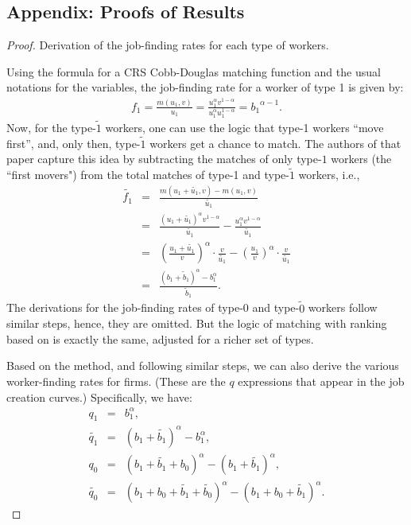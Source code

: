 \documentclass[12pt]{article} %
\theoremstyle{definition}
\begin{document}
\begin{appendix}

\renewcommand{\theequation}{A.\arabic{equation}}

\setcounter{equation}{0}

\section{Appendix: Proofs of Results}\label{section appendix proofs}
\begin{proof}{Derivation of the job-finding rates for each type of workers.}

\noindent Using the formula for a CRS Cobb-Douglas matching function and the usual notations for the variables, the job-finding rate for a worker of type 1 is given by: 
\begin{eqnarray*}
     f_1 = \frac{m(u_1,v)}{u_1} =  \frac{u_1^\alpha v^{1-\alpha}}{u_1^\alpha u_1^{1-\alpha}}  = {b_1}^{\alpha-1}.  
\end{eqnarray*}
Now, for the type-$\tilde{1}$ workers, one can use the \cite{petrongolo2001looking} logic that type-1 workers “move first”, and, only then, type-$\tilde{1}$ workers get a chance to match. The authors of that paper capture this idea by subtracting the matches of only type-${1}$ workers (the ``first movers") from the total matches of type-1 and type-$\tilde{1}$ workers, i.e.,  
\begin{eqnarray*}
     \tilde{f_1} &=& \frac{m(u_1+\tilde{u_1},v)-m(u_1,v)}{\tilde{u_1}} \\
      &=& \frac{(u_1+\tilde{u_1})^\alpha v^{1-\alpha}}{\tilde{u_1}} -\frac{u_1^\alpha v^{1-\alpha}}{\tilde{u_1}} \\
        &=& \left(\frac{u_1+\tilde{u_1}}{v}\right)^{\alpha} \cdot \frac{v}{\tilde{u_1}} - \left(\frac{u_1}{v}\right)^{\alpha}\cdot  \frac{v}{\tilde{u_1}}  \\
        &=& \frac{(b_1+\tilde{b}_1)^\alpha - b_1^\alpha}{\tilde{b}_1}.
\end{eqnarray*}The derivations for the job-finding rates of type-0 and type-$\tilde{0}$ workers follow similar steps, hence, they are omitted. But the logic of matching with ranking based on \cite{petrongolo2001looking} is exactly the same, adjusted for a richer set of types. 

Based on the \cite{petrongolo2001looking} method, and following similar steps, we can also derive the various worker-finding rates for firms. (These are the $q$ expressions that appear in the job creation curves.) Specifically, we have:  
\begin{eqnarray*}
q_1 &=& b_1^\alpha, \\
\tilde{q_1} &=&  (b_1+\tilde{b_1})^\alpha - b_1^\alpha, \\
q_0 &=& (b_1+\tilde{b_1}+b_0)^\alpha - (b_1+\tilde{b_1})^\alpha, \\
\tilde{q_0} &=&  (b_1+b_0+\tilde{b_1}+\tilde{b_0})^\alpha - (b_1+b_0+\tilde{b_1})^\alpha.
\end{eqnarray*}
\end{proof}


\end{appendix}
\end{document}
